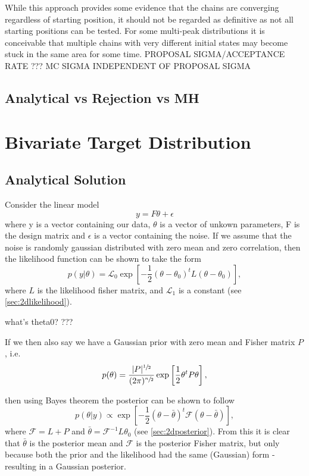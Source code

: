 \documentclass[a4paper,11pt,twoside]{article}
\begin{document}
While this approach provides some evidence that the chains are converging
regardless of starting position, it should not be regarded as definitive as not
all starting positions can be tested. For some multi-peak distributions it is
conceivable that multiple chains with very different initial states may become
stuck in the same area for some time.
PROPOSAL SIGMA/ACCEPTANCE RATE ???
MC SIGMA INDEPENDENT OF PROPOSAL SIGMA

\subsection{Analytical vs Rejection vs MH}

\section{Bivariate Target Distribution} 
\subsection{Analytical Solution}
Consider the linear model
\begin{equation}
	y = F\theta + \epsilon
\end{equation}
where y is a vector containing our data, $\theta$ is a vector of unkown
parameters, F is the design matrix and $\epsilon$ is a vector containing the
noise. If we assume that the noise is randomly gaussian distributed with zero
mean and zero correlation, then the likelihood function can be shown to take the form
\begin{equation}
	p(y|\theta) = \mathcal{L}_0 \exp\left[-\frac{1}{2}(\theta - \theta_0)^tL(\theta - \theta_0)\right],
\end{equation}
where $L$ is the likelihood fisher matrix, and $\mathcal{L}_1$ is a constant (see \cref{sec:2dlikelihood}).

what's theta0? ???

If we then also say we have a Gaussian prior with zero mean and Fisher matrix $P$, i.e.
\begin{equation}
	p(\theta) = \frac{|P|^{\sfrac{1}{2}}}{(2\pi)^{\sfrac{n}{2}}} \exp \left[ \frac{1}{2} \theta^t P \theta \right],
\end{equation}

then using Bayes theorem the posterior can be shown to follow
\begin{equation}
	p(\theta|y) \propto \exp \left[ -\frac{1}{2} (\theta - \bar{\theta})^t \mathcal{F} (\theta - \bar{\theta}) \right],
\end{equation}
where $\mathcal{F} = L + P$ and $\bar{\theta} = \mathcal{F}^{-1}L\theta_0$ (see \cref{sec:2dposterior}).
From this it is clear that $\bar{\theta}$ is the posterior mean and
$\mathcal{F}$ is the posterior Fisher matrix, but only because both the prior
and the likelihood had the same (Gaussian) form - resulting in a Gaussian
posterior.
\end{document}
